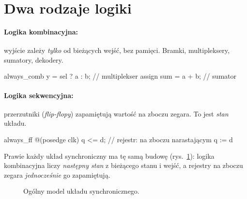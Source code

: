\section{Dwa rodzaje logiki}

\paragraph{Logika kombinacyjna:} wyjście zależy \emph{tylko} od bieżących
wejść, bez pamięci. Bramki, multipleksery, sumatory, dekodery.
\begin{sv}
always_comb y = sel ? a : b;      // multiplekser
assign sum = a + b;               // sumator
\end{sv}

\paragraph{Logika sekwencyjna:} przerzutniki (\emph{flip-flopy})
zapamiętują wartość na zboczu zegara. To jest \emph{stan} układu.
\begin{sv}
always_ff @(posedge clk) q <= d;  // rejestr: na zboczu narastającym q := d
\end{sv}

Prawie każdy układ synchroniczny ma tę samą budowę (rys.~\ref{fig:sync}):
logika kombinacyjna liczy \emph{następny stan} z bieżącego stanu i
wejść, a rejestry na zboczu zegara \emph{jednocześnie} go zapamiętują.

\begin{figure}[h]
\centering
{}
\caption{Ogólny model układu synchronicznego.}
\label{fig:sync}
\end{figure}

